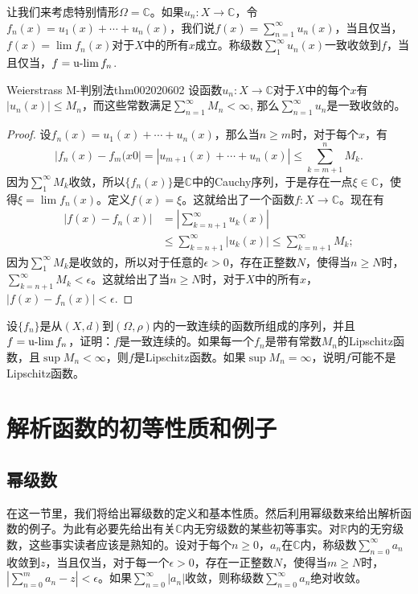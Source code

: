 让我们来考虑特别情形$\Omega = \mathbb{C}$。如果$u_n: X \to \mathbb{C}$，令$f_n(x) = u_1(x)+\cdots+u_n(x)$，我们说$f(x) = \sum\limits_{n=1}^{\infty}{u_n(x)}$，当且仅当，$f(x)=\lim{f_n(x)}$对于$X$中的所有$x$成立。称级数$\sum\limits_{1}^{\infty}{u_n(x)}$一致收敛到$f$，当且仅当，$f = \operatorname{u-lim}{f_n}$.

\begin{theorem}{Weierstrass M-判别法}{thm002020602}
设函数$u_n:X \to \mathbb{C}$对于$X$中的每个$x$有$|u_n(x)| \le M_n$，而这些常数满足$\sum\limits_{n=1}^{\infty}{M_n} < \infty$, 那么$\sum\limits_{n=1}^{\infty}{u_n}$是一致收敛的。
\end{theorem}

\begin{proof}
设$f_n(x)= u_1(x)+\cdots+u_n(x)$，那么当$n \ge m$时，对于每个$x$，有
\[
|f_n(x)-f_m(x0| = |u_{m+1}(x) + \cdots + u_n(x)| \le \sum_{k=m+1}^{n}{M_k}.
\]
因为$\sum\limits_{1}^{\infty}{M_k}$收敛，所以$\{f_n(x)\}$是$\mathbb{C}$中的Cauchy序列，于是存在一点$\xi \in \mathbb{C}$，使得$\xi = \lim{f_n(x)}$。定义$f(x) = \xi$。这就给出了一个函数$f: X \to \mathbb{C}$。现在有
\[
\begin{aligned}
|f(x)-f_n(x)| &= |\sum_{k=n+1}^{\infty}{u_k(x)}| \\
& \le \sum_{k=n+1}^{\infty}{|u_k(x)|} \le \sum_{k=n+1}^{\infty}{M_k};
\end{aligned}
\]
因为$\sum\limits_{1}^{\infty}{M_k}$是收敛的，所以对于任意的$\epsilon > 0$，存在正整数$N$，使得当$n \ge N$时，$\sum\limits_{k=n+1}^{\infty}{M_k} < \epsilon$。这就给出了当$n \ge N$时，对于$X$中的所有$x$，$|f(x)-f_n(x)| < \epsilon$.
\end{proof}

\begin{exercise}
设$\{f_n\}$是从$(X, d)$到$(\Omega, \rho)$内的一致连续的函数所组成的序列，并且$f = \operatorname{u-lim}{f_n}$，证明：$f$是一致连续的。如果每一个$f_n$是带有常数$M_n$的Lipschitz函数，且$\sup{M_n} < \infty$，则$f$是Lipschitz函数。如果$\sup{M_n} = \infty$，说明$f$可能不是Lipschitz函数。
\end{exercise}

\chapter{解析函数的初等性质和例子}\label{chapter00203}

\section{幂级数}\label{section0020301}
在这一节里，我们将给出幂级数的定义和基本性质。然后利用幂级数来给出解析函数的例子。为此有必要先给出有关$\mathbb{C}$内无穷级数的某些初等事实。对$\mathbb{R}$内的无穷级数，这些事实读者应该是熟知的。设对于每个$n \ge 0$，$a_n$在$\mathbb{C}$内，称级数$\sum\limits_{n=0}^{\infty}{a_n}$收敛到$z$，当且仅当，对于每一个$\epsilon > 0$，存在一正整数$N$，使得当$m \ge N$时，$|\sum\limits_{n=0}^{m}{a_n} - z| < \epsilon$。如果$\sum\limits_{n=0}^{\infty}{|a_n|}$收敛，则称级数$\sum\limits_{n=0}^{\infty}{a_n}$绝对收敛。

